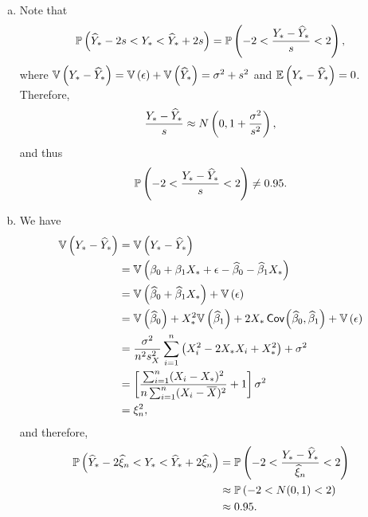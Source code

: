 \begin{ex}
  \begin{enumerate}[(a)]
    \item Note that
          \[
            \mathbb{P}\left(\widehat{Y}_*-2s < Y_* < \widehat{Y}_*+2s\right)
            =\mathbb{P}\left(-2 < \frac{Y_*-\widehat{Y}_*}{s} < 2\right),
          \]
          where $\mathbb{V}\left(Y_*-\widehat{Y}_*\right)=\mathbb{V}\left(\epsilon\right)+\mathbb{V}\left(\widehat{Y}_*\right)=\sigma^2+s^2$
          and $\mathbb{E}\left(Y_*-\widehat{Y}_*\right)=0$. Therefore,
          \[
            \frac{Y_*-\widehat{Y}_*}{s}\approx N\left(0, 1+\frac{\sigma^2}{s^2}\right),
          \]
          and thus
          \[
            \mathbb{P}\left(-2 < \frac{Y_*-\widehat{Y}_*}{s} < 2\right)\neq 0.95.
          \]
    \item We have
          \begin{align*}
            \mathbb{V}\left(Y_*-\widehat{Y}_*\right)
             & =\mathbb{V}\left(Y_*-\widehat{Y}_*\right)                                                                     \\
             & =\mathbb{V}\left(\beta_0+\beta_1X_*+\epsilon-\widehat{\beta}_0-\widehat{\beta}_1X_*\right)                            \\
             & =\mathbb{V}\left(\widehat{\beta}_0+\widehat{\beta}_1X_*\right)+\mathbb{V}\left(\epsilon\right)                                         \\
             & =\mathbb{V}\left(\widehat{\beta}_0\right)+X_*^2\mathbb{V}\left(\widehat{\beta}_1\right)+2X_*\,\textsf{Cov}\mkern-2mu\left(\widehat{\beta}_0,\widehat{\beta}_1 \right)+\mathbb{V}\left(\epsilon\right) \\
             & =\frac{\sigma^2}{n^2s_X^2}
            \sum_{i=1}^n\left(X_i^2-2X_*X_i+X_*^2
            \right)+\sigma^2                                                                          \\
             & =\left[\frac{\sum_{i=1}^n(X_i-X_*)^2}{n\sum_{i=1}^n(X_i-\overline{X})^2}+1\right]\sigma^2     \\
             & =\xi_n^2,
          \end{align*}
          and therefore,
          \begin{align*}
            \mathbb{P}\left(\widehat{Y}_*-2\widehat{\xi}_n < Y_* < \widehat{Y}_*+2\widehat{\xi}_n\right)
             & =\mathbb{P}\left(-2 < \frac{Y_*-\widehat{Y}_*}{\widehat{\xi}_n} < 2\right) \\
             & \approx \mathbb{P}\left(-2 < N(0,1) < 2\right)                       \\
             & \approx 0.95.
          \end{align*}
  \end{enumerate}
\end{ex}

\begin{ex}~
  \inputminted{python}{../code/ex13_11.py}
  \inputminted{text}{../output/ex13_11.txt}
\end{ex}